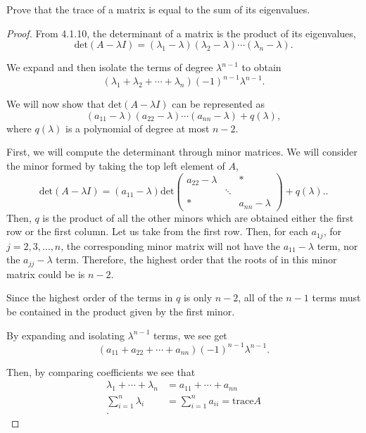 \documentclass{article}
\begin{document}
  Prove that the trace of a matrix is equal to the sum of its eigenvalues.

  \begin{proof}
   From 4.1.10, the determinant of a matrix is the product of its eigenvalues,
   \[
   \text{det}(A-\lambda I)=(\lambda_1-\lambda)(\lambda_2-\lambda)\cdots(\lambda_n-\lambda)
   .\] 

   We expand and then isolate the terms of degree $\lambda^{n-1}$ to obtain
   \[
     (\lambda_1+\lambda_2+\cdots+\lambda_n){(-1)}^{n-1}\lambda^{n-1}
   .\] 

   We will now show that $\text{det}(A-\lambda I)$ can be represented as \[
     (a_{11}-\lambda)(a_{22}-\lambda)\cdots(a_{nn}-\lambda)+q(\lambda)
   ,\]
   where $q(\lambda)$ is a polynomial of degree at most $n-2$.

  First, we will compute the determinant through minor matrices. We will consider the minor formed by taking the top left element of $A$,
   \[
     \text{det}(A-\lambda I)=(a_{11}-\lambda)\text{det}\begin{pmatrix} a_{22}-\lambda & & * \\ & \ddots & \\ * & & a_{nn}-\lambda \end{pmatrix}+q(\lambda).
  .\] 
  Then, $q$ is the product of all the other minors which are obtained either the first row or the first column. Let us take from the first row. Then, for each $a_{1j}$, for $j=2,3,\ldots,n$, the corresponding minor matrix will not have the $a_{11}-\lambda$ term, nor the $a_{jj}-\lambda$ term. Therefore, the highest order that the roots of in this minor matrix could be is $n-2$. 

  Since the highest order of the terms in $q$ is only $n-2$, all of the $n-1$ terms must be contained in the product given by the first minor. 

  By expanding and isolating $\lambda^{n-1}$ terms, we see get
  \[
    (a_{11}+a_{22}+\cdots+a_{nn}){(-1)}^{n-1}{\lambda}^{n-1}
  .\] 

  Then, by comparing coefficients we see that
  \begin{align*}
    \lambda_1+\cdots+\lambda_n&= a_{11}+\cdots+a_{nn} \\
    \sum_{i=1}^{n}\lambda_i &= \sum_{i=1}^{n}a_{ii} = \text{trace}A \\
  .\end{align*}

  \end{proof}
\end{document}

